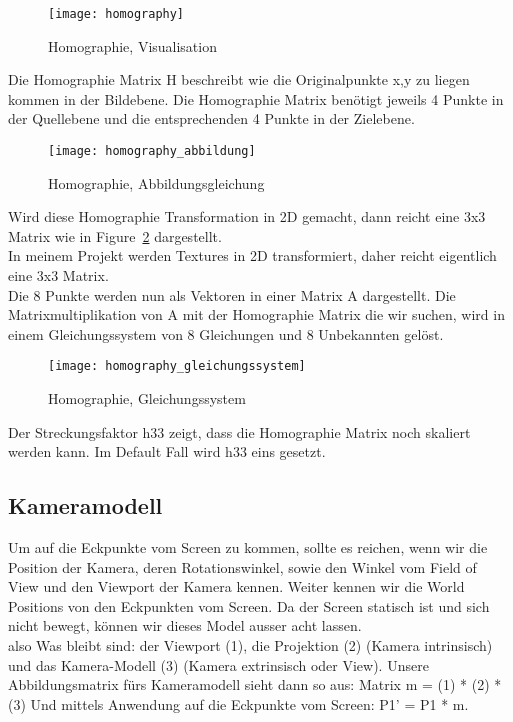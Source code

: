 \begin{figure}[H]
\texttt{[image: homography]}
\caption{Homographie, Visualisation}
\label{fig:homograpie:1}
\end{figure}
		
Die Homographie Matrix H beschreibt wie die Originalpunkte x,y zu liegen kommen in der Bildebene. Die Homographie Matrix benötigt jeweils 4 Punkte in der Quellebene und die entsprechenden 4 Punkte in der Zielebene. \\ 
		
			
\begin{figure}[H]
\texttt{[image: homography\_abbildung]}
\caption{Homographie, Abbildungsgleichung}
\label{fig:homograpie:2}
\end{figure}

Wird diese Homographie Transformation in 2D gemacht, dann reicht eine 3x3 Matrix wie in Figure~\ref{fig:homograpie:2} dargestellt.
\\ In meinem Projekt werden Textures in 2D transformiert, daher reicht eigentlich eine 3x3 Matrix. \\Die 8 Punkte werden nun als Vektoren in einer Matrix A dargestellt. Die Matrixmultiplikation von A mit der Homographie Matrix die wir suchen, wird in einem Gleichungssystem von 8 Gleichungen und 8 Unbekannten gelöst.
			
			
\begin{figure}[H]
\texttt{[image: homography\_gleichungssystem]}
\caption{Homographie, Gleichungssystem}
\label{fig:homograpie:3}
\end{figure}
		
Der Streckungsfaktor h33 zeigt, dass die Homographie Matrix noch skaliert werden kann. Im Default Fall wird h33 eins gesetzt.
\cite{OntarioTech}
\cite{HomographyEstimation}
			
\subsection{Kameramodell}


Um auf die Eckpunkte vom Screen zu kommen, sollte es reichen, wenn wir die Position der Kamera, deren Rotationswinkel, sowie den Winkel vom Field of View und den Viewport der Kamera kennen. Weiter kennen wir die World Positions von den Eckpunkten vom Screen. Da der Screen statisch ist und sich nicht bewegt, können wir dieses Model ausser acht lassen. \\ also Was bleibt sind: der Viewport (1), die Projektion (2) (Kamera intrinsisch) und das Kamera-Modell (3) (Kamera extrinsisch oder View).
Unsere Abbildungsmatrix fürs Kameramodell sieht dann so aus:
Matrix m = (1) * (2) * (3)
Und mittels Anwendung auf die Eckpunkte vom Screen:
P1' = P1 * m.
